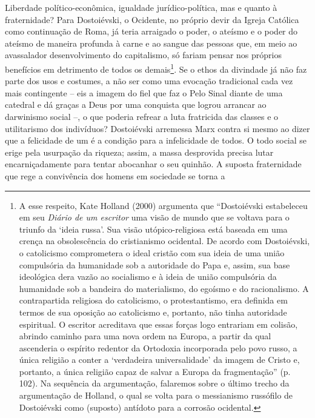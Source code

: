 Liberdade político-econômica, igualdade jurídico-política, mas e quanto
à fraternidade? Para Dostoiévski, o Ocidente, no próprio devir da Igreja
Católica como continuação de Roma, já teria arraigado o poder, o ateísmo
e o poder do ateísmo de maneira profunda à carne e ao sangue das pessoas
que, em meio ao avassalador desenvolvimento do capitalismo, só fariam
pensar nos próprios benefícios em detrimento de todos os
demais\footnote{A esse respeito, Kate Holland (2000) argumenta que
  ``Dostoiévski estabeleceu em seu \emph{Diário de um escritor} uma
  visão de mundo que se voltava para o triunfo da `ideia russa'. Sua
  visão utópico-religiosa está baseada em uma crença na obsolescência do
  cristianismo ocidental. De acordo com Dostoiévski, o catolicismo
  comprometera o ideal cristão com sua ideia de uma união compulsória da
  humanidade sob a autoridade do Papa e, assim, sua base ideológica dera
  vazão ao socialismo e à ideia de união compulsória da humanidade sob a
  bandeira do materialismo, do egoísmo e do racionalismo. A
  contrapartida religiosa do catolicismo, o protestantismo, era definida
  em termos de sua oposição ao catolicismo e, portanto, não tinha
  autoridade espiritual. O escritor acreditava que essas forças logo
  entrariam em colisão, abrindo caminho para uma nova ordem na Europa, a
  partir da qual ascenderia o espírito redentor da Ortodoxia incorporada
  pelo povo russo, a única religião a conter a `verdadeira
  universalidade' da imagem de Cristo e, portanto, a única religião
  capaz de salvar a Europa da fragmentação'' (p. 102). Na sequência da
  argumentação, falaremos sobre o último trecho da argumentação de
  Holland, o qual se volta para o messianismo russófilo de Dostoiévski
  como (suposto) antídoto para a corrosão ocidental.}. Se o ethos da
divindade já não faz parte dos usos e costumes, a não ser como uma
evocação tradicional cada vez mais contingente -- eis a imagem do fiel
que faz o Pelo Sinal diante de uma catedral e dá graças a Deus por uma
conquista que logrou arrancar ao darwinismo social --, o que poderia
refrear a luta fratricida das classes e o utilitarismo dos indivíduos?
Dostoiévski arremessa Marx contra si mesmo ao dizer que a felicidade de
um é a condição para a infelicidade de todos. O todo social se erige
pela usurpação da riqueza; assim, a massa desprovida precisa lutar
encarniçadamente para tentar abocanhar o seu quinhão. A suposta
fraternidade que rege a convivência dos homens em sociedade se torna a
